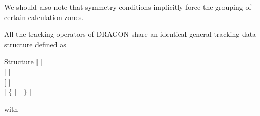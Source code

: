 We should also note that symmetry conditions implicitly force the grouping of
certain calculation zones.

\vskip 0.2cm

All the tracking operators of DRAGON share an identical general tracking data
structure defined as

\begin{DataStructure}{Structure }
$[$   $]$\\
$[$   $]$ \\
$[$   $]$\\
$[$ $\{$  $|$  $|$  $\}$ $]$
\end{DataStructure}

\noindent with

